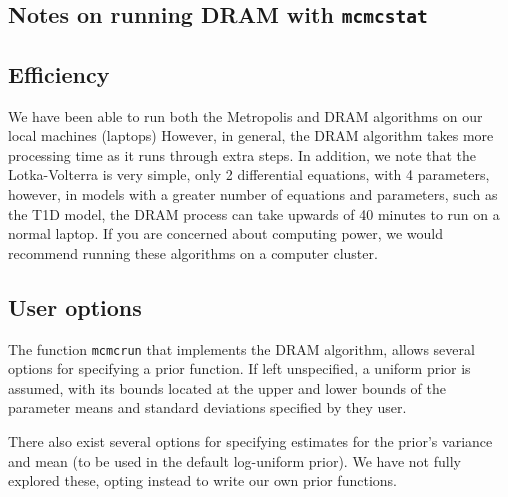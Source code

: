 \documentclass{article}
\begin{document}
\begin{appendices}
\section{Notes on running DRAM with \texttt{mcmcstat}}
\subsection{Efficiency}  We have been able to run both the Metropolis and DRAM algorithms on our local machines (laptops) However, in general, the DRAM algorithm takes more processing time as it runs through extra steps. In addition, we note that the Lotka-Volterra is very simple, only 2 differential equations, with 4 parameters, however, in models with a greater number of equations and parameters, such as the T1D model, the DRAM process can take upwards of 40 minutes to run on a normal laptop. If you are concerned about computing power, we would recommend running these algorithms on a computer cluster.
\subsection{User options}
The function \texttt{mcmcrun} that implements the DRAM algorithm, allows several options for specifying a prior function. If left unspecified, a uniform prior is assumed, with its bounds located at the upper and lower bounds of the parameter means and standard deviations specified by they user.
\par There also exist several options for specifying estimates for the prior's variance and mean (to be used in the default log-uniform prior). We have not fully explored these, opting instead to write our own prior functions.
\end{appendices}
\end{document}
